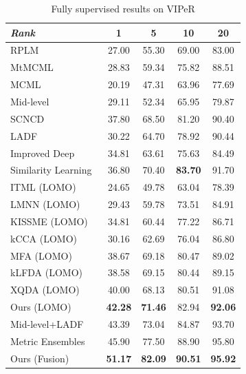 \documentclass[10pt,twocolumn,letterpaper]{article}
\begin{document}
		\setlength{\tabcolsep}{5pt}
	\begin{table}
		\centering
	\caption{Fully supervised results on VIPeR}	
		\label{VIPER}
		\begin{tabular}{|l||c c c c|}
		\hline
		

			{\em Rank} & 1 & 5 & 10 & 20 \\

			\hline
			\hline

RPLM~\cite{hirzer2012relaxed} & 27.00  & 55.30 & 69.00  & 83.00 \\
MtMCML~\cite{ma2014person}& 28.83 & 59.34 & 75.82 & 88.51\\ 
MCML~\cite{MCML_GlobersonR05}&20.19 &47.31  &63.96  &77.69 \\
Mid-level~\cite{zhao2014learning}& 29.11 & 52.34 & 65.95 & 79.87\\ 
SCNCD~\cite{yang2014salient} & 37.80 & 68.50 & 81.20 & 90.40 \\
LADF~\cite{li2013learning}&30.22 &64.70  &78.92   &90.44 \\
Improved Deep~\cite{ahmed2015improved}&34.81 &63.61 &75.63 &84.49 \\
Similarity Learning~\cite{chen2015similarity} &36.80 &70.40 & \bf 83.70 &91.70\\
ITML (LOMO)~\cite{davis2007information}&24.65 &49.78 &63.04 &78.39\\
LMNN (LOMO)~\cite{weinberger2005distance}&29.43 &59.78 &73.51 &84.91\\
KISSME (LOMO)~\cite{koestinger2012large}&34.81 &60.44 &77.22 &86.71\\
kCCA (LOMO)~\cite{lisanti2014matching} & 30.16 & 62.69 & 76.04 & 86.80 \\
MFA (LOMO)~\cite{xiong2014person}&38.67 &69.18 &80.47 &89.02 \\
kLFDA (LOMO)~\cite{xiong2014person}&38.58 &69.15 &80.44 &89.15\\
XQDA (LOMO)~\cite{liao2015person} &40.00 &68.13 &80.51 &91.08 \\
Ours (LOMO) &\bf 42.28 & \bf 71.46 &82.94 &\bf 92.06 \\
\hline
\hline
Mid-level+LADF~\cite{zhao2014learning} & 43.39 & 73.04 & 84.87 & 93.70 \\
Metric Ensembles~\cite{paisitkriangkrailearning} & 45.90  &77.50  &88.90 &95.80    \\
 Ours (Fusion)& \bf 51.17 & \bf 82.09 & \bf 90.51 & \bf 95.92 \\
\hline

		\end{tabular}
	\end{table}
\end{document}
